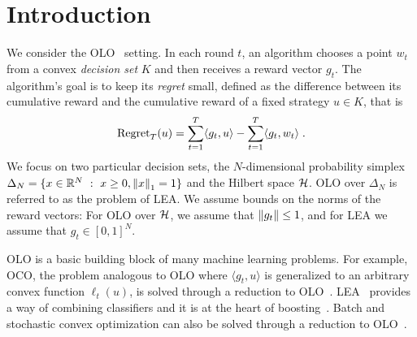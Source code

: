 \section{Introduction}
\label{section:introduction}

\vspace{-0.2cm}

We consider the \ac{OLO}~\cite{Cesa-Bianchi-Lugosi-2006, Shalev-Shwartz-2011}
setting. In each round $t$, an algorithm chooses a point $w_t$ from a convex
\emph{decision set} $K$ and then receives a reward vector $g_t$. The algorithm's
goal is to keep its \emph{regret} small, defined as the difference between its
cumulative reward and the cumulative reward of a fixed strategy $u \in K$, that
is
\vspace{-.1cm}
\[
\operatorname{Regret}_T(u) = \sum_{t=1}^T \langle g_t, u \rangle - \sum_{t=1}^T \langle g_t, w_t \rangle \; .
\]
We focus on two particular decision sets, the $N$-dimensional probability simplex
$\Delta_N = \{ x \in \mathbb{R}^N ~:~ x \ge 0, \left\|{x}\right\|_1 = 1\}$ and the Hilbert space
$\mathcal{H}$.  \ac{OLO} over $\Delta_N$ is referred to as the problem of \ac{LEA}.  We
assume bounds on the norms of the reward vectors: For \ac{OLO} over $\mathcal{H}$, we
assume that $\left\|{g_t}\right\| \le 1$, and for \ac{LEA} we assume that $g_t \in
[0,1]^N$.

\vspace{-0.1cm}

\ac{OLO} is a basic building block of many machine learning problems. For
example, \ac{OCO}, the problem analogous to \ac{OLO} where $\langle g_t, u
\rangle$ is generalized to an arbitrary convex function $\ell_t(u)$, is solved
through a reduction to \ac{OLO}~\cite{Shalev-Shwartz-2011}.
\ac{LEA}~\cite{Littlestone-Warmuth-1994, Vovk-1998,
Cesa-Bianchi-Freund-Haussler-Helmbold-Schapire-Warmuth-1997} provides a way of
combining classifiers and it is at the heart of
boosting~\cite{Freund-Schapire-1997}. Batch and stochastic convex optimization
can also be solved through a reduction to \ac{OLO}~\cite{Shalev-Shwartz-2011}.

\vspace{-0.1cm}

